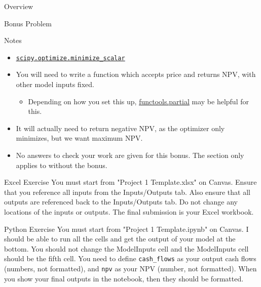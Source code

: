 \documentclass[]{article}
\begin{document}
\begin{section}{Overview}
\begin{subsection}{Bonus Problem}
\begin{subsubsection}{Notes}
\begin{itemize}
\begin{itemize}
\item \textcolor{blue}{\underline{\href{https://docs.scipy.org/doc/scipy/reference/generated/scipy.optimize.minimize\_scalar.html\#scipy-optimize-minimize-scalar}{\texttt{scipy.optimize.minimize\_scalar}}}}
\item You will need to write a function which accepts price and returns NPV, with other model inputs fixed.
\begin{itemize}
\item Depending on how you set this up,
\textcolor{blue}{\underline{\href{https://www.learnpython.org/en/Partial\_functions}{functools.partial}}}
may be helpful for this.
\end{itemize}
\item It will actually need to return negative NPV, as the optimizer only minimizes, but we want maximum NPV.
\item No answers to check your work are given for this bonus. The
section only applies to without the bonus.
\end{itemize}
\end{itemize}
\end{subsubsection}
\end{subsection}
\end{section}
\begin{section}{Excel Exercise}
You must start from "Project 1 Template.xlsx" on Canvas. Ensure that you reference all inputs from the Inputs/Outputs tab. Also ensure that all outputs are referenced back to the Inputs/Outputs tab. Do not change any locations of the inputs or outputs. The final submission is your Excel workbook.
\end{section}
\begin{section}{Python Exercise}
You must start from "Project 1 Template.ipynb" on Canvas. I should be able to run all the cells and get the output of your model at the bottom. You should not change the ModelInputs cell and the ModelInputs cell should be the fifth cell. You need to define
\texttt{cash\_flows}
as your output cash flows (numbers, not formatted), and 
\texttt{npv}
as your NPV (number, not formatted). When you show your final outputs in the notebook, then they should be formatted.
\end{section}
\end{document}

